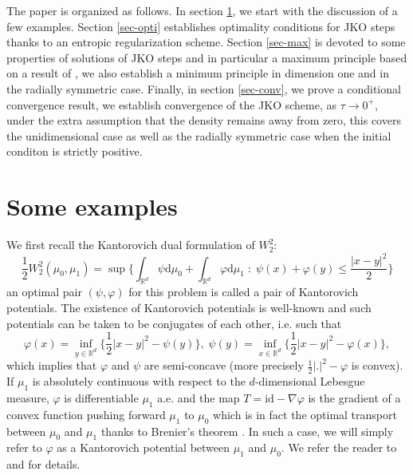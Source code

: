 \documentclass[12pt, a4paper]{article}
\numberwithin{equation}{section}
\theoremstyle{plain}
\theoremstyle{definition}
\theoremstyle{remark}
\newcommand{\R}{\mathbb{R}}
\newcommand{\id}{\mathrm{id}}
\begin{document}
\smallskip

The paper is organized as follows. In section \ref{sec-examples}, we start with the discussion of a few examples. Section \ref{sec-opti} establishes optimality conditions for JKO steps thanks to an  entropic regularization scheme. Section \ref{sec-max} is devoted to some properties of solutions of JKO steps and in particular a maximum principle based on a result of \cite{de2016bv}, we also establish a minimum principle in dimension one and in the radially symmetric case.  Finally,  in section \ref{sec-conv}, we prove  a conditional convergence result, we establish convergence of the JKO scheme, as $\tau\to 0^+$, under the extra assumption that the density remains away from zero, this covers the unidimensional case as well as the  radially symmetric case when the initial conditon is strictly positive.


\section{Some examples}\label{sec-examples}


We first  recall the Kantorovich dual formulation of $W_2^2$:
\begin{equation}\label{dualformW2}
\frac{1}{2}W_2^2(\mu_0, \mu_1)=\sup \Big\{\int_{\R^d} \psi \mbox{d} \mu_0 + \int_{\R^d} \varphi \mbox{d}\mu_1 \; : \; \psi(x)+\varphi(y)\le \frac{\vert x-y\vert^2}{2}  \Big\}
\end{equation}
an optimal pair $(\psi, \varphi)$ for this problem is called a pair of Kantorovich potentials. The existence of Kantorovich potentials is well-known and such potentials can be taken to be conjugates of each other, i.e. such that
\[\varphi(x)=\inf_{y\in \R^d} \{\frac{1}{2}\vert x-y\vert^2-\psi(y)\}, \; \psi(y)=\inf_{x\in \R^d} \{\frac{1}{2}\vert x-y\vert^2-\varphi(x)\},\]
which implies that $\varphi$ and $\psi$ are semi-concave (more precisely $\frac{1}{2} \vert . \vert^2-\varphi$ is convex). If $\mu_1$ is absolutely continuous with respect to the $d$-dimensional Lebesgue measure, $\varphi$ is differentiable $\mu_1$ a.e. and the map $T=\id - \nabla \varphi$ is the gradient of a convex function pushing forward $\mu_1$ to $\mu_0$ which is in fact the optimal transport between $\mu_0$ and $\mu_1$ thanks to Brenier's theorem \cite{brenier91}. In such a case, we will simply refer to $\varphi$ as a Kantorovich potential between $\mu_1$ and $\mu_0$. We refer the reader to \cite{villanitop} and \cite{santambrogio2015optimal} for details.
\end{document}
